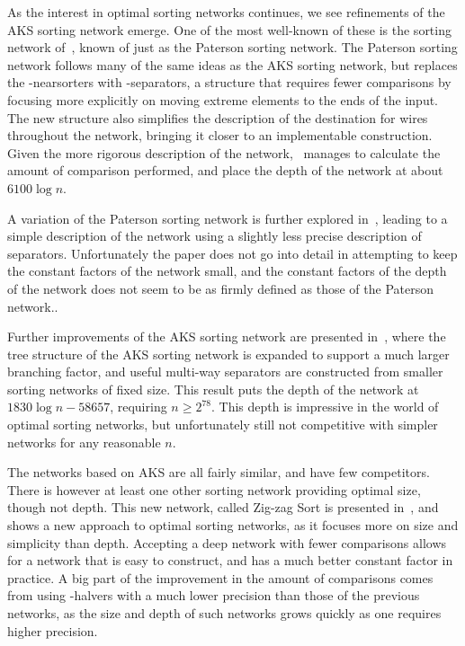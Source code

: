 As the interest in optimal sorting networks continues, we see refinements of the AKS sorting network emerge. One of the most well-known of these is the sorting network of~, known of just as the Paterson sorting network. The Paterson sorting network follows many of the same ideas as the AKS sorting network, but replaces the \textepsilon -nearsorters with \textepsilon -separators, a structure that requires fewer comparisons by focusing more explicitly on moving extreme elements to the ends of the input. The new structure also simplifies the description of the destination for wires throughout the network, bringing it closer to an implementable construction. Given the more rigorous description of the network,~ manages to calculate the amount of comparison performed, and place the depth of the network at about $6100 \log n$.

A variation of the Paterson sorting network is further explored in~, leading to a simple description of the network using a slightly less precise description of separators. Unfortunately the paper does not go into detail in attempting to keep the constant factors of the network small, and the constant factors of the depth of the network does not seem to be as firmly defined as those of the Paterson network..

Further improvements of the AKS sorting network are presented in~, where the tree structure of the AKS sorting network is expanded to support a much larger branching factor, and useful multi-way separators are constructed from smaller sorting networks of fixed size. 
This result puts the depth of the network at $1830 \log n - 58657$, requiring $n \geq 2^{78}$. This depth is impressive in the world of optimal sorting networks, but unfortunately still not competitive with simpler networks for any reasonable $n$.

The networks based on AKS are all fairly similar, and have few competitors. There is however at least one other sorting network providing optimal size, though not depth. This new network, called Zig-zag Sort is presented in~, and shows a new approach to optimal sorting networks, as it focuses more on size and simplicity than depth. Accepting a deep network with fewer comparisons allows for a network that is easy to construct, and has a much better constant factor in practice. A big part of the improvement in the amount of comparisons comes from using \textepsilon -halvers with a much lower precision than those of the previous networks, as the size and depth of such networks grows quickly as one requires higher precision.

